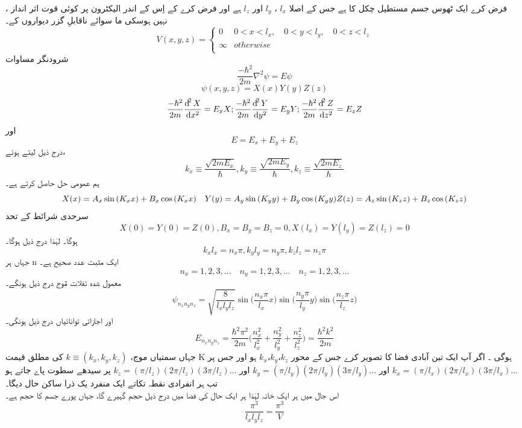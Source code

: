 ، فرض کرے ایک ٹھوس جسم مستطیل چکل کا ہے جس کے اصلا
 \(l_{x}\)
 ،
 \(l_{y}\)
  اور
 \(l_{z}\)
    ہے  اور فرض کرے کے اِس کے اندر الیکٹرون پر کوئی قوت اثر انداز نہیں ہوسکی ما سوائے ناقابلِ گزر دیواروں کے۔
\begin{equation}
V(x,y,z)=
\begin{cases}
0 & 0<x<l_{x}, \quad 0<y<l_{y}, \quad 0<z<l_{z}\\
\infty & otherwise\\
\end{cases}
\end{equation}
شرودنگر مساوات
\[\frac{-\hbar^{2}}{2m}\nabla^{2}\psi=E\psi\]
\[\psi(x,y,z)=X(x)Y(y)Z(z)\]
\[\frac{-\hbar^{2}}{2m}\frac{\dif^{2}X}{\dif{x}^{2}}=E_{x}X ; \frac{-\hbar^{2}}{2m}\frac{\dif^{2}Y}{\dif{y}^{2}}=E_{y}Y ; \frac{-\hbar^{2}}{2m}\frac{\dif^{2}Z}{\dif{z}^{2}}=E_{z}Z\]
اور
\[E=E_{x}+E_{y}+E_{z}\]
درج ذیل لیتے ہوئے،
\[k_{x}\equiv \frac{\sqrt{2mE_{x}}}{\hbar}, k_{y}\equiv\frac{\sqrt{2mE_{y}}}{\hbar}, k_{z}\equiv \frac{\sqrt{2mE_{z}}}{\hbar}\]
 ہم عمومی حل حاصل کرتے ہے۔
\begin{equation}
X(x)=A_{x}\sin{(K_{x}x)}+B_{x}\cos{(K_{x}x)} \quad Y(y)=A_{y}\sin{(K_{y}y)}+B_{y}\cos{(K_{y}y)}\\
Z(z)=A_{z}\sin{(K_{z}z)}+B_{z}\cos{(K_{z}z)}\\
\end{equation}
سرحدی شرائط کے تحد 
\[X(0)=Y(0)=Z(0), B_{x}=B_{y}=B_{z}=0, X(l_{x})=Y(l_{y})=Z(l_{z})=0\]
ہوگا۔ لہٰذا درج ذیل ہوگا۔
\[k_{x}l_{x}=n_{x}\pi, k_{y}l_{y}=n_{y}\pi, k_{z}l_{z}=n_{z}\pi\]
جہاں ہر n ایک مثبت عدد صحیح ہے۔
\[n_{x}=1,2,3,\dotsc \quad n_{y}=1,2,3,\dotsc \quad n_{z}=1,2,3,\dotsc\]
معمول شدہ تفلات مٌوج درج ذیل ہونگے۔
\[\psi_{n_{x}n_{y}n_{z}}=\sqrt{\frac{8}{l_{x}l_{y}l_{z}}}\sin{\big(\frac{n_{x}\pi}{l_{x}} x\big)}\sin{\big(\frac{n_{y}\pi}{l_{y}} y\big)}\sin{\big(\frac{n_{z}\pi}{l_{z}} z\big)}\]
اور اجازاتی توانائياں درج ذیل ہونگی۔
\[E_{n_{x}n_{y}n_{z}}=\frac{\hbar^{2}\pi^{2}}{2m}\big(\frac{n_{x}^{2}}{l_{x}^{2}}+\frac{n_{y}^{2}}{l_{y}^{2}}+\frac{n_{z}^{2}}{l_{z}^{2}}\big )=\frac{\hbar^{2}k^{2}}{2m}\]
جہاں سمتیاں موج، 
\(k\equiv (k_{x},k_{y},k_{z})\)
 کی مطلق قیمت K ہوگی ۔
اگر آپ ایک تین آبادی فضا کا تصویر کرے جس کے محور
\(k_{x}، k_{y} ،k_{z}\)
 ہو اور جس پر
\(k_{x}=(\pi/l_{x})(2\pi/l_{x})(3\pi/l_{x})\dotsc\)
اور
\(k_{y}=(\pi/l_{y})(2\pi/l_{y})(3\pi/l_{y})\dotsc\)
اور
\(k_{z}=(\pi/l_{z})(2\pi/l_{z})(3\pi/l_{z})\dotsc\)
پر سیدھے سطوت پاے جاتے ہو تب ہر انفرادی نقطہ تکاتے ایک منفرد یک ذرا ساکن حال دیگا۔\\
اس جال میں ہر ایک خانہ لہٰذا ہر ایک حال کی فضا میں درج ذیل حجم گہیرے گا، جہاں  پورے جسم کا حجم ہے۔
\[\frac{\pi^{3}}{l_{x}l_{y}l_{z}}=\frac{\pi^{3}}{V}\]


